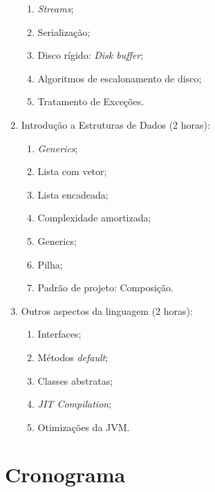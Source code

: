 \documentclass{article}
\begin{document}
\begin{enumerate}
\begin{samepage}
\begin{enumerate}
                \item \textit{Streams};
                \item Serialização;
                \item Disco rígido: \textit{Disk buffer};
                \item Algoritmos de escalonamento de disco;
                \item Tratamento de Exceções.
            \end{enumerate}
        \end{samepage}
    \item Introdução a Estruturas de Dados (2 horas):
        \begin{samepage}
            \begin{enumerate}
                \item \textit{Generics};
                \item Lista com vetor;
                \item Lista encadeada;
                \item Complexidade amortizada;
                \item Generics;
                \item Pilha;
                \item Padrão de projeto: Composição.
            \end{enumerate}
        \end{samepage}
    \item Outros aspectos da linguagem (2 horas):
        \begin{samepage}
            \begin{enumerate}
                \item Interfaces;
                \item Métodos \textit{default};
                \item Classes abstratas;
                \item \textit{JIT Compilation};
                \item Otimizações da JVM\@.
            \end{enumerate}
        \end{samepage}
\end{enumerate}

\section{Cronograma}
\end{document}
